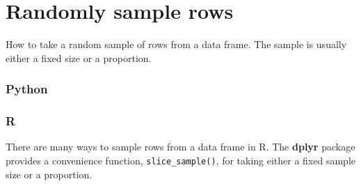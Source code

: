 \documentclass[
]{book}
\begin{document}
\hypertarget{randomly-sample-rows}{%
\section{Randomly sample rows}\label{randomly-sample-rows}}

How to take a random sample of rows from a data frame. The sample is usually either a fixed size or a proportion.

\hypertarget{python-22}{%
\subsubsection*{Python}\label{python-22}}

\hypertarget{r-22}{%
\subsubsection*{R}\label{r-22}}

There are many ways to sample rows from a data frame in R. The \textbf{dplyr} package provides a convenience function, \texttt{slice\_sample()}, for taking either a fixed sample size or a proportion.
\end{document}
